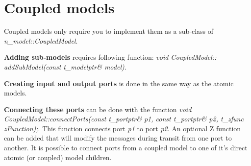 \section{Coupled models}
Coupled models only require you to implement them as a sub-class of \\ \textsl{n\_model::CoupledModel}.

\textbf{Adding sub-models} requires following function: \textsl{void CoupledModel:: \\addSubModel(const t\_modelptr\& model)}.

\textbf{Creating input and output ports} is done in the same way as the atomic models.

\textbf{Connecting these ports} can be done with the function \textsl{void CoupledModel::connectPorts(const t\_portptr\& p1, const t\_portptr\& p2, t\_zfunc zFunction);}. This function connects port \textsl{p1} to port \textsl{p2}. An optional Z function can be added that will modify the messages during transit from one port to another.
It is possible to connect ports from a coupled model to one of it's direct atomic (or coupled) model children.